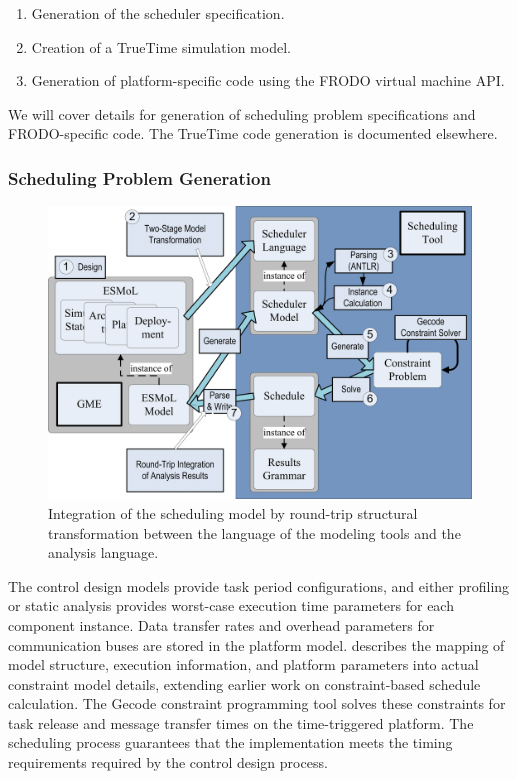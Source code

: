\begin{enumerate}
 \item Generation of the scheduler specification.
 \item Creation of a TrueTime simulation model.
 \item Generation of platform-specific code using the FRODO virtual machine API.
\end{enumerate}

We will cover details for generation of scheduling problem 
specifications and FRODO-specific code.  The TrueTime code generation
is documented elsewhere\cite{modeling:truetime}.

\subsubsection*{Scheduling Problem Generation}
\label{section:schedules}

\begin{figure}
\centering
\includegraphics[width=0.85\columnwidth]{figures/sched_integration.png}
    \caption{Integration of the scheduling model by round-trip structural transformation between the language 
of the modeling tools and the analysis language.}
    \label{fig:sched_int}
\end{figure}

The control design models provide task period configurations, and 
either profiling or static analysis provides worst-case 
execution time parameters for each component instance.  
Data transfer rates and overhead parameters for communication
buses are stored in the platform model. \cite{sched:analysis}
describes the mapping of model structure, execution information,
and platform parameters into actual constraint model details, 
extending earlier work on constraint-based schedule 
calculation\cite{sched:offline}. The Gecode constraint programming
tool \cite{tools:gecode} solves these constraints for task release and
message transfer times on the time-triggered platform. The scheduling process
guarantees that the implementation meets the timing requirements 
required by the control design process.

